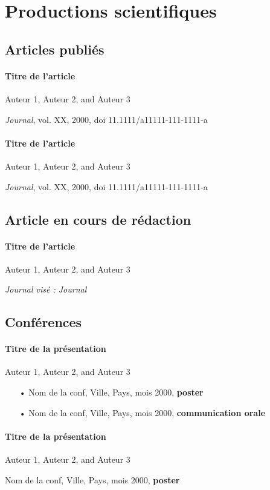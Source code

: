 \chapter*{Productions scientifiques}

\section*{Articles publiés}

	\subsubsection{Titre de l'article}
Auteur 1, Auteur 2, and Auteur 3

\textit{Journal}, vol. XX, 2000, doi 11.1111/a11111-111-1111-a

	\subsubsection{Titre de l'article}
Auteur 1, Auteur 2, and Auteur 3

\textit{Journal}, vol. XX, 2000, doi 11.1111/a11111-111-1111-a


\section*{Article en cours de rédaction}

	\subsubsection{Titre de l'article}
Auteur 1, Auteur 2, and Auteur 3

\textit{Journal visé : Journal}


\section*{Conférences}
	\subsubsection{Titre de la présentation}
Auteur 1, Auteur 2, and Auteur 3
\begin{itemize}
	\item[•] Nom de la conf, Ville, Pays, mois 2000, \textbf{poster}
	\item[•] Nom de la conf, Ville, Pays, mois 2000, \textbf{communication orale}
\end{itemize}

	\subsubsection{Titre de la présentation}
Auteur 1, Auteur 2, and Auteur 3

Nom de la conf, Ville, Pays, mois 2000, \textbf{poster}


\clearpage
\thispagestyle{empty}